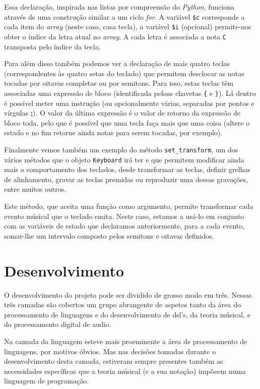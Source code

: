 \documentclass[
  oneside,
  11pt, a4paper,
  footinclude=true,
  headinclude=true,
  cleardoublepage=empty
]{scrbook}
\begin{document}
    Essa declaração, inspirada nas listas por compreensão do \textit{Python}, funciona através de uma construção similar a um ciclo \textit{for}. A variável \texttt{\$c} corresponde a cada item do \textit{array} (neste caso, casa tecla), a variável \texttt{\$i} (opcional) permite-nos obter o índice da letra atual no \textit{array}. A cada letra é associada a nota \texttt{C} transposta pelo índice da tecla.
    
    Para além disso também podemos ver a declaração de mais quatro teclas (correspondentes às quatro setas do teclado) que permitem desclocar as notas tocadas por oitavas completas ou por semitons. Para isso, estas teclas têm associadas uma expressão de bloco (identificada peloas chavetas \texttt{\{} e \texttt{\}}). Lá dentro é possível meter uma instrução (ou opcionalmente várias, separadas por pontos e vírgulas \textbf{;}). O valor da última expressão é o valor de retorno da expressão de bloco toda, pelo que é possível que uma tecla faça mais que uma coisa (altere o estado e no fim retorne ainda notas para serem tocadas, por exemplo).
    
    Finalmente vemos também um exemplo do método \texttt{set\_transform}, um dos vários métodos que o objeto \texttt{Keyboard} irá ter e que permitem modificar ainda mais o comportamento dos teclados, desde transformar as teclas, definir grelhas de alinhamento, gravar as teclas premidas ou reproduzir uma dessas gravações, entre muitos outros.
    
    Este método, que aceita uma função como argumento, permite transformar cada evento músical que o teclado emita. Neste caso, estamos a usá-lo em conjunto com as variáveis de estado que declaramos anteriormente, para a cada evento, somar-lhe um intervalo composto pelos semitons e oitavas definidos.
    
    
	\chapter{Desenvolvimento}
	O desenvolvimento do projeto pode ser dividido de grosso modo em três. Nessas três camadas são cobertos um grupo abrangente de aspetos tanto da área do processamento de linguagens e do desenvolvimento de \acrshort{dsl}'s, da teoria músical, e do processamento digital de audio. 
	
	Na camada da linguagem esteve mais proeminente a área de processamento de linguagens, por motivos óbvios. Mas nas decisões tomadas durante o desenvolvimento desta camada, estiveram sempre presentes também as necessidades específicas que a teoria músical (e a sua notação) impõeem numa linguagem de programação.
	
\end{document}
